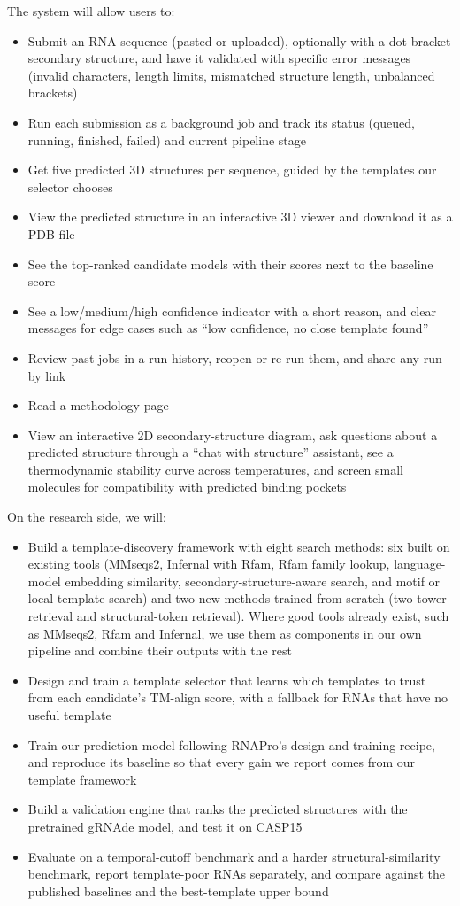\documentclass{FastFyp}
\begin{document}
The system will allow users to:
\begin{itemize}
\item Submit an RNA sequence (pasted or uploaded), optionally with a dot-bracket secondary structure, and have it validated with specific error messages (invalid characters, length limits, mismatched structure length, unbalanced brackets)
\item Run each submission as a background job and track its status (queued, running, finished, failed) and current pipeline stage
\item Get five predicted 3D structures per sequence, guided by the templates our selector chooses
\item View the predicted structure in an interactive 3D viewer and download it as a PDB file
\item See the top-ranked candidate models with their scores next to the baseline score
\item See a low/medium/high confidence indicator with a short reason, and clear messages for edge cases such as ``low confidence, no close template found''
\item Review past jobs in a run history, reopen or re-run them, and share any run by link
\item Read a methodology page
\item View an interactive 2D secondary-structure diagram, ask questions about a predicted structure through a ``chat with structure'' assistant, see a thermodynamic stability curve across temperatures, and screen small molecules for compatibility with predicted binding pockets
\end{itemize}

On the research side, we will:
\begin{itemize}
\item Build a template-discovery framework with eight search methods: six built on existing tools (MMseqs2, Infernal with Rfam, Rfam family lookup, language-model embedding similarity, secondary-structure-aware search, and motif or local template search) and two new methods trained from scratch (two-tower retrieval and structural-token retrieval). Where good tools already exist, such as MMseqs2, Rfam and Infernal, we use them as components in our own pipeline and combine their outputs with the rest
\item Design and train a template selector that learns which templates to trust from each candidate's TM-align score, with a fallback for RNAs that have no useful template
\item Train our prediction model following RNAPro's design and training recipe, and reproduce its baseline so that every gain we report comes from our template framework
\item Build a validation engine that ranks the predicted structures with the pretrained gRNAde model, and test it on CASP15
\item Evaluate on a temporal-cutoff benchmark and a harder structural-similarity benchmark, report template-poor RNAs separately, and compare against the published baselines and the best-template upper bound
\end{itemize}
\end{document}
